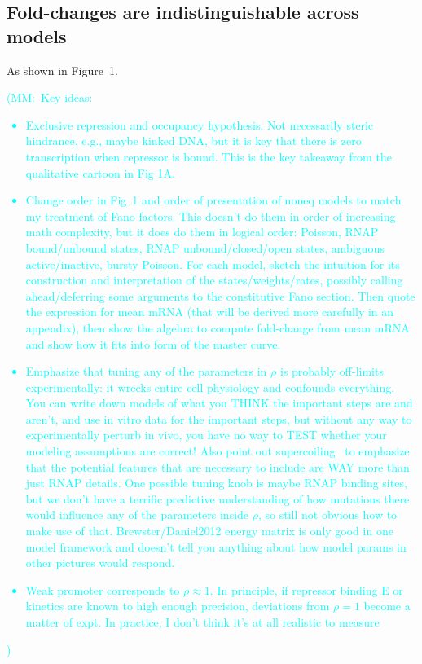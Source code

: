 \documentclass[12pt]{article}%
\newcommand{\mmnote}[1]{\textcolor{cyan}{(MM:~#1)}}
\begin{document}
\subsection{Fold-changes are indistinguishable across models}
As shown in Figure~1.
\mmnote{Key ideas:
\begin{itemize}
\item Exclusive repression and occupancy hypothesis. Not
necessarily steric hindrance, e.g., maybe kinked DNA, but it is
key that there is zero transcription when repressor is bound.
This is the key takeaway from the qualitative cartoon in Fig 1A.
\item Change order in Fig~1 and order of presentation of noneq
models to match my treatment of Fano factors. This doesn't do
them in order of increasing math complexity, but it does do them
in logical order: Poisson, RNAP bound/unbound states, RNAP
unbound/closed/open states, ambiguous active/inactive, bursty
Poisson. For each model, sketch the intuition for its
construction and interpretation of the states/weights/rates,
possibly calling ahead/deferring some arguments to the
constitutive Fano section. Then quote the expression for mean
mRNA (that will be derived more carefully in an appendix), then
show the algebra to compute fold-change from mean mRNA and show
how it fits into form of the master curve.
\item Emphasize that tuning any of the parameters in $\rho$ is
probably off-limits experimentally: it wrecks entire cell
physiology and confounds everything. You can write down models of
what you THINK the important steps are and aren't, and use in
vitro data for the important steps, but without any way to
experimentally perturb in vivo, you have no way to TEST whether
your modeling assumptions are correct! Also point out
supercoiling~\cite{Chong2014,Sevier2016} to emphasize that the
potential features that are necessary to include are WAY more
than just RNAP details. One possible tuning knob is maybe RNAP
binding sites, but we don't have a terrific predictive
understanding of how mutations there would influence any of the
parameters inside $\rho$, so still not obvious how to make use of
that. Brewster/Daniel2012 energy matrix is only good in one model
framework and doesn't tell you anything about how model params in
other pictures would respond.
\item Weak promoter corresponds to $\rho\approx 1$. In principle,
if repressor binding E or kinetics are known to high enough
precision, deviations from $\rho=1$ become a matter of expt. In
practice, I don't think it's at all realistic to measure

\end{itemize}}
\end{document}
